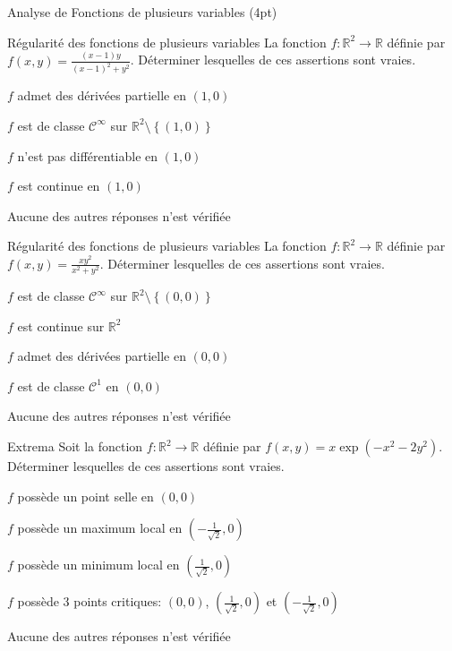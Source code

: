 \documentclass[12pt]{article}
\begin{document}
\begin{quiz}[points=4, multiple, shuffle, penalty=.5]
  {Analyse de Fonctions de plusieurs variables (4pt)}


  \begin{multi}{R\'{e}gularit\'{e} des fonctions de plusieurs variables}
    La fonction $f:\mathbb R^2\to \mathbb R$ d\'{e}finie par $f(x,y) = \frac{(x-1) y}{(x-1)^2 + y^2}$.  D\'{e}terminer lesquelles de ces assertions sont vraies.

    \item* $f$ admet des d\'{e}riv\'{e}es partielle en $(1,0)$
    \item* $f$ est de classe $\mathcal C^\infty$ sur $\mathbb R^2 \setminus \left\{(1,0) \right\}$
    \item* $f$ n'est pas diff\'{e}rentiable en $(1,0)$
    \item $f$ est continue en $(1,0)$
    \item Aucune des autres r\'{e}ponses n'est v\'{e}rifi\'{e}e
  \end{multi}

  \begin{multi}{R\'{e}gularit\'{e} des fonctions de plusieurs variables}
    La fonction $f:\mathbb R^2\to \mathbb R$ d\'{e}finie par $f(x,y) = \frac{xy^2}{x^2 + y^2}$. D\'{e}terminer lesquelles de ces assertions sont vraies.

    \item* $f$ est de classe $\mathcal C^\infty$ sur $\mathbb R^2 \setminus \left\{(0,0) \right\}$
    \item* $f$ est continue sur $\mathbb R^2$
    \item* $f$ admet des d\'{e}riv\'{e}es partielle en $(0,0)$
    \item $f$ est de classe $\mathcal C^1$ en $(0,0)$
    \item Aucune des autres r\'{e}ponses n'est v\'{e}rifi\'{e}e
  \end{multi}


  \begin{multi}{Extrema}
    Soit la fonction $f:\mathbb R^2\to \mathbb R$ d\'{e}finie par $f(x,y) = x\exp(-x^2 - 2y^2)$. D\'{e}terminer lesquelles de ces assertions sont vraies.

  \item $f$ poss\`{e}de un point selle en $(0, 0)$
  \item $f$ poss\`{e}de un maximum local en $(-\frac{1}{\sqrt 2}, 0)$
  \item $f$ poss\`{e}de un minimum local en $(\frac{1}{\sqrt2}, 0)$
  \item $f$ poss\`{e}de 3 points critiques: $(0,0)$, $(\frac{1}{\sqrt 2}, 0)$ et $(-\frac{1}{\sqrt 2}, 0)$
  \item* Aucune des autres r\'{e}ponses n'est v\'{e}rifi\'{e}e
  \end{multi}



\end{quiz}
\end{document}
